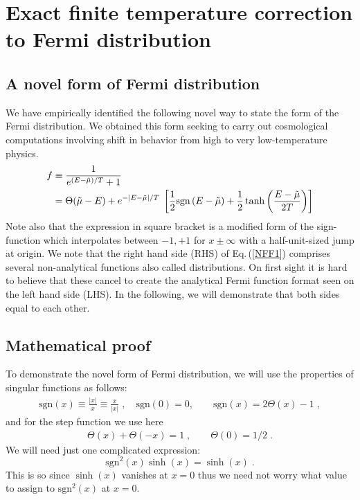 \documentclass[sn-mathphys,Numbered]{sn-jnl}
\theoremstyle{thmstyleone}%
\theoremstyle{thmstyletwo}%
\theoremstyle{thmstylethree}%
\begin{document}
\section{Exact finite temperature correction to Fermi distribution}\label{NewFermi}

\subsection{A novel form of Fermi distribution}
We have empirically identified the following novel way to state the form of the Fermi distribution. We obtained this form seeking to carry out cosmological computations involving shift in behavior from high to very low-temperature physics. 
\begin{align}\label{NFF1}
f&\equiv \frac{1}{e^{ (E-\tilde\mu)/T} +1}\notag\\
&=\Theta(\tilde\mu - E) +  e^{ - |E-\tilde\mu|/T }
\; \left[\frac{1}{2}\mathrm{sgn}\left({E-\tilde\mu}\right) 
 +\frac{1}{2}\tanh\left(\frac{E-\tilde\mu}{2T}\right)\right]
\end{align}
Note also that the expression in square bracket is a modified form of the sign-function which interpolates between $-1,+1$ for $x\pm \infty$ with a half-unit-sized jump at origin.  We note  that the right hand side (RHS) of Eq.\,(\ref{NFF1}) comprises several non-analytical functions also called distributions. On first sight it is hard to believe that  these   cancel to create the analytical Fermi function format seen on the left hand side (LHS). In the following, we will demonstrate that both sides equal to each other.


\subsection{Mathematical proof}
To demonstrate the novel form of Fermi distribution, we will use the properties of singular functions as follows: 
\begin{align}\label{NFF2a}
\mathrm{sgn}(x)%
\equiv  \frac{|x|}{x}\equiv \frac{x}{|x|}\;,
   \quad \mathrm{sgn}(0)=0,\qquad
 \mathrm{sgn}(x)=2\Theta(x)-1\;,
 \end{align}
 and for the step function we use here
 \begin{align}
\label{NFF2c}
 \Theta(x)+\Theta(-x)=1\;,\qquad
 \Theta(0)=1/2\;.
 \end{align}
We will need just one complicated expression:
\begin{equation}\label{NFFa1}
\mathrm{sgn}^{2}(x)\sinh(x)=\sinh(x)\;.
 \end{equation}
This is so since $\sinh(x)$  vanishes  at $x=0$ thus we need not worry what value to assign to $\mathrm{sgn}^{2}(x)$ at $x=0$.  
\end{document}
